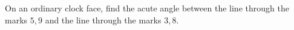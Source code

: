 On an ordinary clock face, find the acute angle between the line through the marks $5,9$ and the line through the marks $3,8$.
